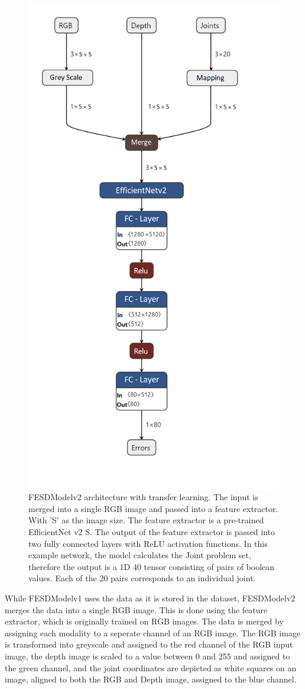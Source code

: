 \begin{figure}[htbp]
  \centering
  \includegraphics[width=.5\linewidth]{figures/Model/FESDv2.png}
  \caption[FESDModel architecture version 2]{FESDModelv2 architecture with transfer learning. The input is merged into a single RGB image and passed into a feature extractor. With 'S' as the image size. The feature extractor is a pre-trained EfficientNet v2 S. The output of the feature extractor is passed into two fully connected layers with ReLU activation functions. In this example network, the model calculates the Joint problem set, therefore the output is a 1D 40 tensor consisting of pairs of boolean values. Each of the 20 pairs corresponds to an individual joint.}
  \label{fig:model_architecture_v2}
\end{figure}

While FESDModelv1 uses the data as it is stored in the dataset, FESDModelv2 merges the data into a single RGB image. This is done using the feature extractor, which is originally trained on RGB images. The data is merged by assigning each modality to a seperate channel of an RGB image. The RGB image is transformed into greyscale and assigned to the red channel of the RGB input image, the depth image is scaled to a value between 0 and 255 and assigned to the green channel, and the joint coordinates are depicted as white squares on an image, aligned to both the RGB and Depth image, assigned to the blue channel.

